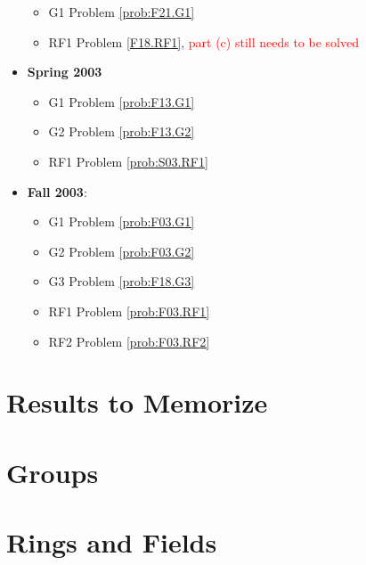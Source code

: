 \documentclass{article}
\theoremstyle{definition}
\begin{document}
\begin{itemize}
	\begin{itemize}
		\item G1 Problem \ref{prob:F21.G1}
		\item RF1 Problem \ref{F18.RF1}, \textcolor{red}{part (c) still needs to be solved}
	\end{itemize}
	\item \textbf{Spring 2003}
	\begin{itemize}
		\item G1 Problem \ref{prob:F13.G1}
		\item G2 Problem \ref{prob:F13.G2}
		\item RF1 Problem \ref{prob:S03.RF1}
	\end{itemize}
	\item \textbf{Fall 2003}:
	\begin{itemize}
		\item G1 Problem \ref{prob:F03.G1}
		\item G2 Problem \ref{prob:F03.G2}
		\item G3 Problem \ref{prob:F18.G3}
		\item RF1 Problem \ref{prob:F03.RF1}
		\item RF2 Problem \ref{prob:F03.RF2}
	\end{itemize}
\end{itemize}

\section{Results to Memorize}

	

\section{Groups}

	

	

	

	

	

	

	

\section{Rings and Fields}
	
\end{document}
